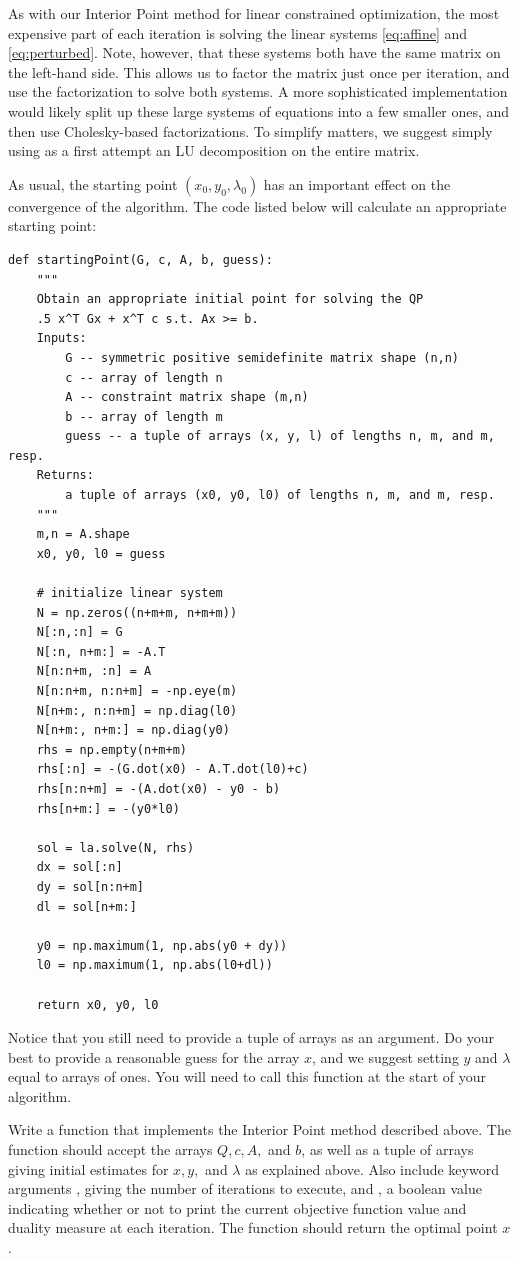 As with our Interior Point method for linear constrained optimization, the most expensive part of each iteration
is solving the linear systems \ref{eq:affine} and \ref{eq:perturbed}. Note, however, that these systems both have
the same matrix on the left-hand side. This allows us to factor the matrix just once per iteration, and use the
factorization to solve both systems. A more sophisticated implementation would likely split up these large
systems of equations into a few smaller ones, and then use Cholesky-based factorizations. To simplify matters, we
suggest simply using as a first attempt an LU decomposition on the entire matrix.

As usual, the starting point $(x_0, y_0, \lambda_0)$ has an important effect on the convergence of the algorithm.
The code listed below will calculate an appropriate starting point:
\begin{lstlisting}
def startingPoint(G, c, A, b, guess):
    """
    Obtain an appropriate initial point for solving the QP
    .5 x^T Gx + x^T c s.t. Ax >= b.
    Inputs:
        G -- symmetric positive semidefinite matrix shape (n,n)
        c -- array of length n
        A -- constraint matrix shape (m,n)
        b -- array of length m
        guess -- a tuple of arrays (x, y, l) of lengths n, m, and m, resp.
    Returns:
        a tuple of arrays (x0, y0, l0) of lengths n, m, and m, resp.
    """
    m,n = A.shape
    x0, y0, l0 = guess

    # initialize linear system
    N = np.zeros((n+m+m, n+m+m))
    N[:n,:n] = G
    N[:n, n+m:] = -A.T
    N[n:n+m, :n] = A
    N[n:n+m, n:n+m] = -np.eye(m)
    N[n+m:, n:n+m] = np.diag(l0)
    N[n+m:, n+m:] = np.diag(y0)
    rhs = np.empty(n+m+m)
    rhs[:n] = -(G.dot(x0) - A.T.dot(l0)+c)
    rhs[n:n+m] = -(A.dot(x0) - y0 - b)
    rhs[n+m:] = -(y0*l0)

    sol = la.solve(N, rhs)
    dx = sol[:n]
    dy = sol[n:n+m]
    dl = sol[n+m:]

    y0 = np.maximum(1, np.abs(y0 + dy))
    l0 = np.maximum(1, np.abs(l0+dl))

    return x0, y0, l0
\end{lstlisting}
Notice that you still need to provide a tuple of arrays  as an argument.
Do your best to provide a reasonable guess for the array $x$, and we suggest setting $y$ and $\lambda$
equal to arrays of ones. You will need to call this function at the start of your algorithm.

\begin{problem}
Write a function  that implements the Interior Point method described above.
The function should accept the arrays $Q, c, A,$ and $b$, as well as a tuple of arrays 
giving initial estimates for $x, y,$ and $\lambda$ as explained above. Also include keyword
arguments , giving the number of iterations to execute, and , a boolean value
indicating whether or not to print the current objective function value and duality measure at each
iteration. The function should return the optimal point $x$.
\end{problem}

